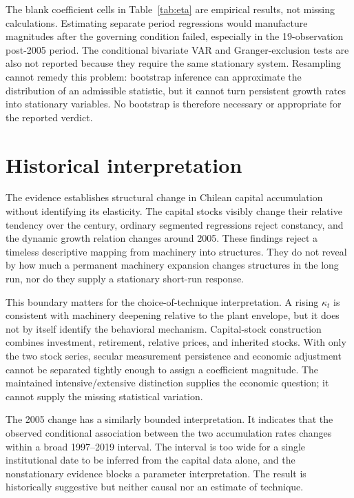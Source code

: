 \documentclass[11pt,a4paper]{article}
\begin{document}


The blank coefficient cells in Table~\ref{tab:eta} are empirical results,
not missing calculations. Estimating separate period regressions would
manufacture magnitudes after the governing condition failed, especially in
the 19-observation post-2005 period. The conditional bivariate VAR and
Granger-exclusion tests are also not reported because they require the same
stationary system. Resampling cannot remedy this problem: bootstrap inference
can approximate the distribution of an admissible statistic, but it cannot
turn persistent growth rates into stationary variables. No bootstrap is
therefore necessary or appropriate for the reported verdict.

\FloatBarrier
\section{Historical interpretation}

The evidence establishes structural change in Chilean capital accumulation
without identifying its elasticity. The capital stocks visibly change their
relative tendency over the century, ordinary segmented regressions reject
constancy, and the dynamic growth relation changes around 2005. These
findings reject a timeless descriptive mapping from machinery into
structures. They do not reveal by how much a permanent machinery expansion
changes structures in the long run, nor do they supply a stationary
short-run response.

This boundary matters for the choice-of-technique interpretation. A rising
\(\kappa_t\) is consistent with machinery deepening relative to the plant
envelope, but it does not by itself identify the behavioral mechanism.
Capital-stock construction combines investment, retirement, relative
prices, and inherited stocks. With only the two stock series, secular
measurement persistence and economic adjustment cannot be separated tightly
enough to assign a coefficient magnitude. The maintained intensive/extensive
distinction supplies the economic question; it cannot supply the missing
statistical variation.

The 2005 change has a similarly bounded interpretation. It indicates that
the observed conditional association between the two accumulation rates
changes within a broad 1997--2019 interval. The interval is too wide for a
single institutional date to be inferred from the capital data alone, and
the nonstationary evidence blocks a parameter interpretation. The result is
historically suggestive but neither causal nor an estimate of technique.
\end{document}
